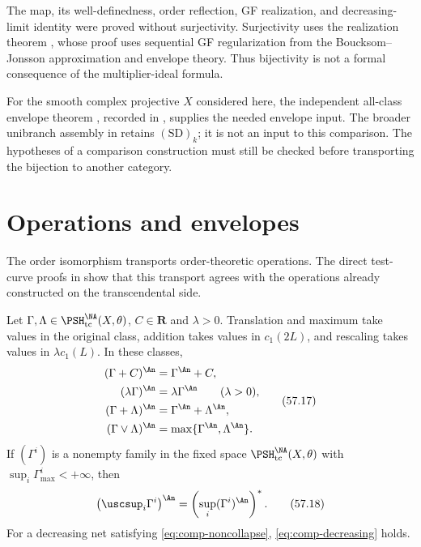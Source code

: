\begin{remark}
\label{rem:comp-envelope-dependence}
The map, its well-definedness, order reflection, GF realization, and
decreasing-limit identity were proved without surjectivity.
Surjectivity uses the realization theorem
\cite[Theorem~3.12(ii)]{DXZ23}, whose proof uses sequential GF
regularization from the Boucksom--Jonsson approximation and envelope
theory.
Thus bijectivity is not a formal consequence of the multiplier-ideal
formula.

For the smooth complex projective $X$ considered here, the independent
all-class envelope theorem \cite[Theorem~A]{BJ22b}, recorded in
, supplies the needed envelope input.
The broader unibranch assembly in 
retains $\mathrm{(SD)}_k$; it is not an input to this comparison.
The hypotheses of a comparison construction must still be checked before
transporting the bijection to another category.
\end{remark}

\section{Operations and envelopes}
\label{sec:comp-operations}

The order isomorphism transports order-theoretic operations.
The direct test-curve proofs in \cite{Xia23Operations} show that this
transport agrees with the operations already constructed on the
transcendental side.

\begin{theorem}\label{thm:comp-operations}
Let $\Gamma,\Lambda\in\PSH^{\NA}_{\mathrm{tc}}(X,\theta)$,
$C\in\mathbf R$ and $\lambda>0$. Translation and maximum take values
in the original class, addition takes values in $c_1(2L)$, and
rescaling takes values in $\lambda c_1(L)$. In these classes,
\[
\begin{aligned}
 (\Gamma+C)^{\An}
     &=\Gamma^{\An}+C,\\
 (\lambda\Gamma)^{\An}
     &=\lambda\Gamma^{\An}\qquad(\lambda>0),\\
 (\Gamma+\Lambda)^{\An}
     &=\Gamma^{\An}+\Lambda^{\An},\\
 (\Gamma\vee\Lambda)^{\An}
     &=\max\{\Gamma^{\An},\Lambda^{\An}\}.
\end{aligned}
\tag{57.17}\label{eq:comp-elementary-operations}
\]
If $(\Gamma^i)$ is a nonempty family in the fixed space
$\PSH^{\NA}_{\mathrm{tc}}(X,\theta)$ with
$\sup_i\Gamma^i_{\max}<+\infty$, then
\[
 \left(\uscsup_i\Gamma^i\right)^{\An}
       =\left(\sup_i(\Gamma^i)^{\An}\right)^*.
\tag{57.18}\label{eq:comp-sup}
\]
For a decreasing net satisfying \eqref{eq:comp-noncollapse},
\eqref{eq:comp-decreasing} holds.
\end{theorem}

